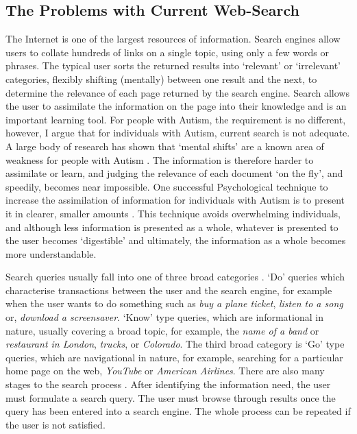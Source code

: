\documentclass[a4paper, 11pt]{article}
\begin{document}
\subsection{The Problems with Current Web-Search}\label{What should search offer people with Autism}

The Internet is one of the largest resources of information. Search engines allow users to collate hundreds of links on a single topic, using only a few words or phrases. The typical user sorts the returned results into `relevant' or `irrelevant' categories, flexibly shifting (mentally) between one result and the next, to determine the relevance of each page returned by the search engine. Search allows the user to assimilate the information on the page into their knowledge and is an important learning tool. For people with Autism, the requirement is no different, however, I argue that for individuals with Autism, current search is not adequate. A large body of research has shown that `mental shifts' are a known area of weakness for people with Autism \cite{disengagement}. The information is therefore harder to assimilate or learn, and judging the relevance of each document `on the fly', and speedily, becomes near impossible. One successful Psychological technique to increase the assimilation of information for individuals with Autism is to present it in clearer, smaller amounts \cite{AdultsWithAutism}. This technique avoids overwhelming individuals, and although less information is presented as a whole, whatever is presented to the user becomes `digestible' and ultimately, the information as a whole becomes more understandable.  \\

\vspace{5mm}

Search queries usually fall into one of three broad categories \cite{seo}.  `Do' queries which characterise transactions between the user and the search engine, for example when the user wants to do something such as \textit{buy a plane ticket}, \textit{listen to a song} or, \textit{download a screensaver}. `Know' type queries, which are informational in nature, usually covering a broad topic, for example, the \textit{name of a band} or \textit{restaurant in London}, \textit{trucks}, or \textit{Colorado}. The third broad category is `Go' type queries, which are navigational in nature, for example, searching for a particular home page on the web, \textit{YouTube} or \textit{American Airlines}. There are also many stages to the search process \cite{seo}. After identifying the information need, the user must formulate a search query. The user must browse through results once the query has been entered into a search engine. The whole process can be repeated if the user is not satisfied. 
\end{document}
